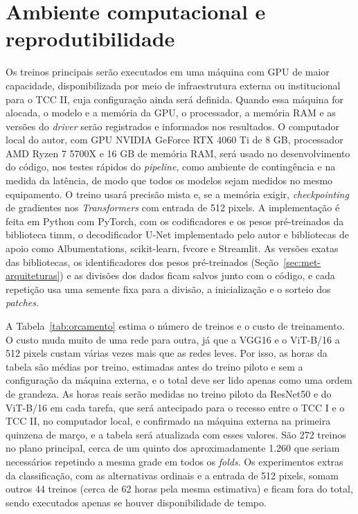 \section{Ambiente computacional e reprodutibilidade}
\label{sec:ambiente-computacional}

Os treinos principais serão executados em uma máquina com GPU de maior capacidade, disponibilizada por meio de infraestrutura externa ou institucional para o TCC II, cuja configuração ainda será definida. Quando essa máquina for alocada, o modelo e a memória da GPU, o processador, a memória RAM e as versões do \textit{driver} serão registrados e informados nos resultados. O computador local do autor, com GPU NVIDIA GeForce RTX 4060 Ti de 8 GB, processador AMD Ryzen 7 5700X e 16 GB de memória RAM, será usado no desenvolvimento do código, nos testes rápidos do \textit{pipeline}, como ambiente de contingência e na medida da latência, de modo que todos os modelos sejam medidos no mesmo equipamento. O treino usará precisão mista e, se a memória exigir, \textit{checkpointing} de gradientes nos \textit{Transformers} com entrada de 512 pixels. A implementação é feita em Python com PyTorch, com os codificadores e os pesos pré-treinados da biblioteca timm, o decodificador U-Net implementado pelo autor e bibliotecas de apoio como Albumentations, scikit-learn, fvcore e Streamlit. As versões exatas das bibliotecas, os identificadores dos pesos pré-treinados (Seção~\ref{sec:met-arquiteturas}) e as divisões dos dados ficam salvos junto com o código, e cada repetição usa uma semente fixa para a divisão, a inicialização e o sorteio dos \textit{patches}.

A Tabela~\ref{tab:orcamento} estima o número de treinos e o custo de treinamento. O custo muda muito de uma rede para outra, já que a VGG16 e o ViT-B/16 a 512 pixels custam várias vezes mais que as redes leves. Por isso, as horas da tabela são médias por treino, estimadas antes do treino piloto e sem a configuração da máquina externa, e o total deve ser lido apenas como uma ordem de grandeza. As horas reais serão medidas no treino piloto da ResNet50 e do ViT-B/16 em cada tarefa, que será antecipado para o recesso entre o TCC I e o TCC II, no computador local, e confirmado na máquina externa na primeira quinzena de março, e a tabela será atualizada com esses valores. São 272 treinos no plano principal, cerca de um quinto dos aproximadamente 1.260 que seriam necessários repetindo a mesma grade em todos os \textit{folds}. Os experimentos extras da classificação, com as alternativas ordinais e a entrada de 512 pixels, somam outros 44 treinos (cerca de 62 horas pela mesma estimativa) e ficam fora do total, sendo executados apenas se houver disponibilidade de tempo.


